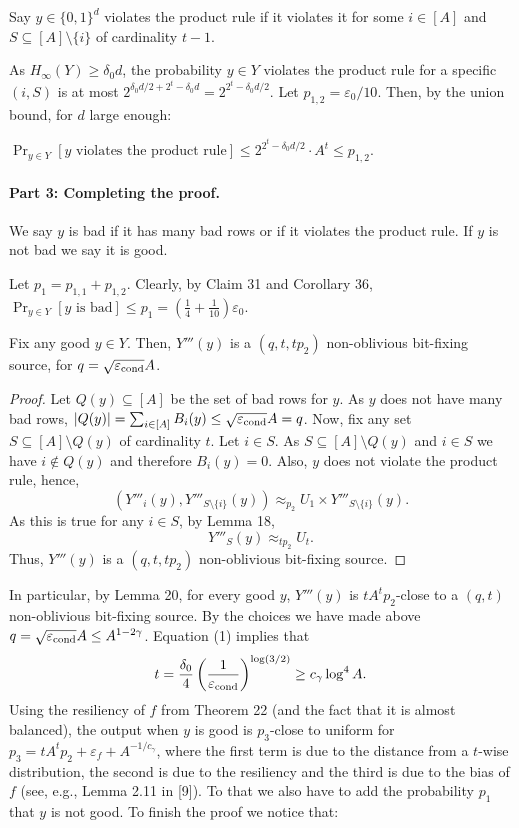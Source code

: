 \begin{definition}
Say $y\in\{0,1\}^d$ violates the product rule if it violates it for some $i\in[A]$ and $S\subseteq[A]\setminus\{i\}$ of cardinality $t-1$.
\end{definition}
As $H_\infty(Y)\ge\delta_0d$, the probability $y\in Y$ violates the product rule for a specific $(i,S)$ is at most $2^{\delta_0d/2+2^t-\delta_0d}=2^{2^t-\delta_0d/2}$. Let $p_{1,2}=\varepsilon_0/10$. Then, by the union bound, for $d$ large enough:
\begin{corollary}$\Pr_{y\in Y}[y\text{ violates the product rule}]\le2^{2^t-\delta_0d/2}\cdot A^t\le p_{1,2}$.\end{corollary}
\paragraph{Part 3: Completing the proof.}
\begin{definition}
We say $y$ is bad if it has many bad rows or if it violates the product rule. If $y$ is not bad we say it is good.
\end{definition}
Let $p_1=p_{1,1}+p_{1,2}$. Clearly, by Claim 31 and Corollary 36, $\Pr_{y\in Y}[y\text{ is bad}]\le p_1=(\frac14+\frac1{10})\varepsilon_0$.
\begin{claim}
Fix any good $y\in Y$. Then, $Y'''(y)$ is a $(q,t,tp_2)$ non-oblivious bit-fixing source, for $q=\sqrt{\varepsilon_{\rm cond}}A$.
\end{claim}
\begin{proof}
Let $Q(y)\subseteq[A]$ be the set of bad rows for $y$. As $y$ does not have many bad rows, $|Q(y)|=\sum_{i\in[A]}B_i(y)\le\sqrt{\varepsilon_{\rm cond}}A=q$.
Now, fix any set $S\subseteq[A]\setminus Q(y)$ of cardinality $t$. Let $i\in S$. As $S\subseteq[A]\setminus Q(y)$ and $i\in S$ we have $i\notin Q(y)$ and therefore $B_i(y)=0$. Also, $y$ does not violate the product rule, hence,
\[(Y'''_i(y),Y'''_{S\setminus\{i\}}(y))\approx_{p_2}U_1\times Y'''_{S\setminus\{i\}}(y).\]
As this is true for any $i\in S$, by Lemma 18,
\[Y'''_S(y)\approx_{tp_2}U_t.\]
Thus, $Y'''(y)$ is a $(q,t,tp_2)$ non-oblivious bit-fixing source.
\end{proof}
In particular, by Lemma 20, for every good $y$, $Y'''(y)$ is $tA^tp_2$-close to a $(q,t)$ non-oblivious bit-fixing source. By the choices we have made above $q=\sqrt{\varepsilon_{\rm cond}}A\le A^{1-2\gamma}$. Equation (1) implies that
\[t=\frac{\delta_0}4\left(\frac1{\varepsilon_{\rm cond}}\right)^{\log(3/2)}\ge c_\gamma\log^4 A.\]
Using the resiliency of $f$ from Theorem 22 (and the fact that it is almost balanced), the output when $y$ is good is $p_3$-close to uniform for $p_3=tA^tp_2+\varepsilon_f+A^{-1/c_\gamma}$, where the first term is due to the distance from a $t$-wise distribution, the second is due to the resiliency and the third is due to the bias of $f$ (see, e.g., Lemma 2.11 in [9]). To that we also have to add the probability $p_1$ that $y$ is not good. To finish the proof we notice that:
